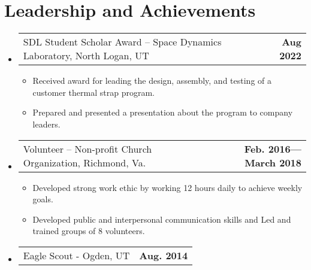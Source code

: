 \documentclass[letterpaper,11pt]{article}
\makeatletter
\newcommand{\resumeProjectHeading}[2]{
    \vspace{-6pt}
    \item
    \begin{tabular*}{1.0\textwidth}{l@{\extracolsep{\fill}}r}
      \small#1 & \textbf{\small #2}\\
    \end{tabular*}\vspace{-11pt}
}
\newcommand{\resumeSubHeadingListStart}{\begin{itemize}[leftmargin=0.0in, label={}]}
\newcommand{\resumeSubHeadingListEnd}{\end{itemize}}
\newcommand{\resumeItemListStart}{\begin{itemize}}
\newcommand{\resumeItemListEnd}{\end{itemize}\vspace{-5pt}}
\newcommand{\resumeItem}[1]{ 
  \item\small{
    {#1 \vspace{-4pt}}
  }
}
\makeatother
\begin{document}
\vspace{-8pt}

\section{Leadership and Achievements }
    \resumeSubHeadingListStart{}
    \resumeProjectHeading{SDL Student Scholar Award – Space Dynamics Laboratory, North Logan, UT	}{Aug 2022}
      \resumeItemListStart{}
        \resumeItem{Received award for leading the design, assembly, and testing of a customer thermal strap program.}
        \resumeItem{Prepared and presented a presentation about the program to company leaders.}
      \resumeItemListEnd{}
    \resumeProjectHeading{Volunteer – Non-profit Church Organization, Richmond, Va.}{Feb. 2016—March 2018}
      \resumeItemListStart{}
        \resumeItem{Developed strong work ethic by working 12 hours daily to achieve weekly goals.}
        \resumeItem{Developed public and interpersonal communication skills and Led and trained groups of 8 volunteers.}
      \resumeItemListEnd{}
    \resumeProjectHeading{Eagle Scout - Ogden, UT}{Aug. 2014}
      \resumeItemListStart{}
      \resumeItemListEnd{}

    \resumeSubHeadingListEnd{}
\vspace{-16pt}
\end{document}
